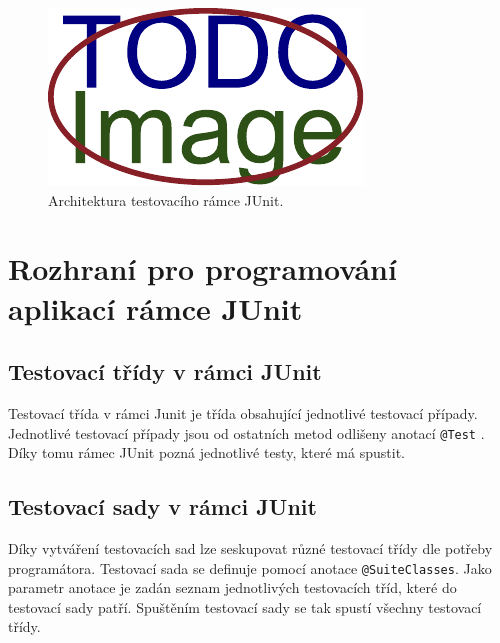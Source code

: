     \begin{figure}[!h]
      \includegraphics[width=\textwidth, center]{obrazky-figures/placeholder.pdf}
      \caption{Architektura testovacího rámce JUnit.}
      \label{fig:junit_arch}
    \end{figure}


  \section{Rozhraní pro programování aplikací rámce JUnit}
    
    \subsection{Testovací třídy v rámci JUnit}
    Testovací třída v rámci Junit je třída obsahující jednotlivé testovací případy. Jednotlivé testovací případy jsou od ostatních metod odlišeny anotací \texttt{@Test} \cite{vogella:JUnit}. Díky tomu rámec JUnit pozná jednotlivé testy, které má spustit.
    
    \subsection{Testovací sady v rámci JUnit}
    Díky vytváření testovacích sad lze seskupovat různé testovací třídy dle potřeby programátora. Testovací sada se definuje pomocí anotace \texttt{@SuiteClasses}. Jako parametr anotace je zadán seznam jednotlivých testovacích tříd, které do testovací sady patří. Spuštěním testovací sady se tak spustí všechny testovací třídy.
    
